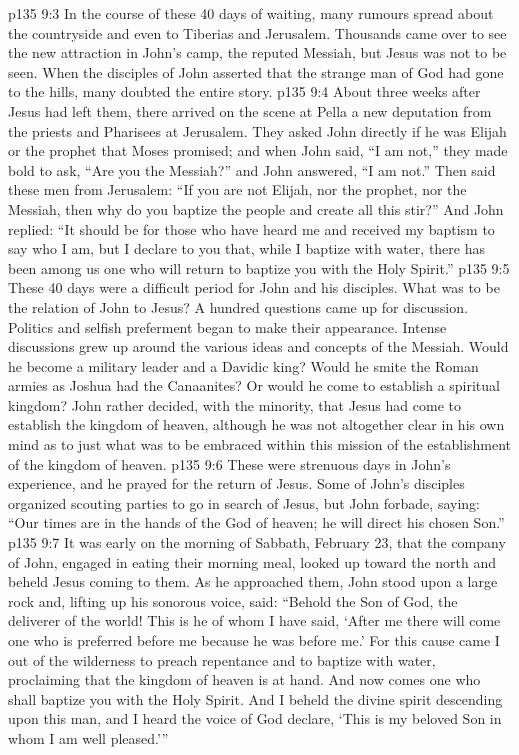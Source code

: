 \vs p135 9:3 In the course of these 40 days of waiting, many rumours spread about the countryside and even to Tiberias and Jerusalem. Thousands came over to see the new attraction in John’s camp, the reputed Messiah, but Jesus was not to be seen. When the disciples of John asserted that the strange man of God had gone to the hills, many doubted the entire story.
\vs p135 9:4 About three weeks after Jesus had left them, there arrived on the scene at Pella a new deputation from the priests and Pharisees at Jerusalem. They asked John directly if he was Elijah or the prophet that Moses promised; and when John said, “I am not,” they made bold to ask, “Are you the Messiah?” and John answered, “I am not.” Then said these men from Jerusalem: “If you are not Elijah, nor the prophet, nor the Messiah, then why do you baptize the people and create all this stir?” And John replied: “It should be for those who have heard me and received my baptism to say who I am, but I declare to you that, while I baptize with water, there has been among us one who will return to baptize you with the Holy Spirit.”
\vs p135 9:5 These 40 days were a difficult period for John and his disciples. What was to be the relation of John to Jesus? A hundred questions came up for discussion. Politics and selfish preferment began to make their appearance. Intense discussions grew up around the various ideas and concepts of the Messiah. Would he become a military leader and a Davidic king? Would he smite the Roman armies as Joshua had the Canaanites? Or would he come to establish a spiritual kingdom? John rather decided, with the minority, that Jesus had come to establish the kingdom of heaven, although he was not altogether clear in his own mind as to just what was to be embraced within this mission of the establishment of the kingdom of heaven.
\vs p135 9:6 These were strenuous days in John’s experience, and he prayed for the return of Jesus. Some of John’s disciples organized scouting parties to go in search of Jesus, but John forbade, saying: “Our times are in the hands of the God of heaven; he will direct his chosen Son.”
\vs p135 9:7 \pc It was early on the morning of Sabbath, February 23, that the company of John, engaged in eating their morning meal, looked up toward the north and beheld Jesus coming to them. As he approached them, John stood upon a large rock and, lifting up his sonorous voice, said: “Behold the Son of God, the deliverer of the world! This is he of whom I have said, ‘After me there will come one who is preferred before me because he was before me.’ For this cause came I out of the wilderness to preach repentance and to baptize with water, proclaiming that the kingdom of heaven is at hand. And now comes one who shall baptize you with the Holy Spirit. And I beheld the divine spirit descending upon this man, and I heard the voice of God declare, ‘This is my beloved Son in whom I am well pleased.’”
